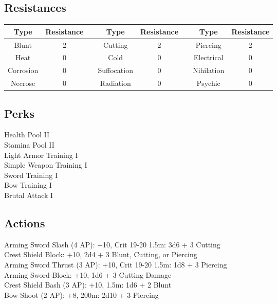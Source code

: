 \subsection{Resistances}
\begin{minipage}[H]{1\textwidth}
	\centering
	\begin{tabular}[c]{|c | c | c | c | c | c | c | c|}
		\hline
		Type & Resistance && Type & Resistance && Type & Resistance\\
		\hline
		Blunt & 2 &&
		Cutting & 2 &&
		Piercing & 2\\
		Heat & 0 &&
		Cold & 0 &&
		Electrical & 0\\
		Corrosion & 0 &&
		Suffocation & 0 &&
		Nihilation & 0 \\
		Necrose & 0 &&
		Radiation & 0 &&
		Psychic & 0\\
		\hline
	\end{tabular}
\end{minipage}

\subsection{Perks}
Health Pool II\\
Stamina Pool II\\
Light Armor Training I\\
Simple Weapon Training I\\
Sword Training I\\
Bow Training I\\
Brutal Attack I\\

\subsection{Actions}
Arming Sword Slash (4 AP): +10, Crit 19-20 1.5m: 3d6 + 3 Cutting\\

Crest Shield Block: +10, 2d4 + 3 Blunt, Cutting, or Piercing\\

Arming Sword Thrust (3 AP): +10, Crit 19-20 1.5m: 1d8 + 3 Piercing\\

Arming Sword Block: +10, 1d6 + 3 Cutting Damage\\

Crest Shield Bash (3 AP): +10, 1.5m: 1d6 + 2 Blunt\\

Bow Shoot (2 AP): +8, 200m: 2d10 + 3 Piercing\\

